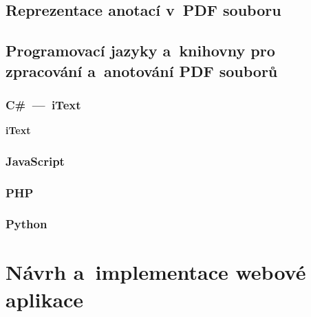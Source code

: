 \dummyText


\section{Reprezentace anotací v~PDF souboru}

\DummyText


\section{Programovací jazyky a~knihovny pro zpracování a~anotování PDF souborů}

\dummyShortText[5]


\subsection*{C\#~---~iText}

\dummyShortText[12]

\textbf{iText}
\dummyText


\subsection*{JavaScript}



\subsection*{PHP}


\subsection*{Python}






\chapter{Návrh a~implementace webové aplikace}

